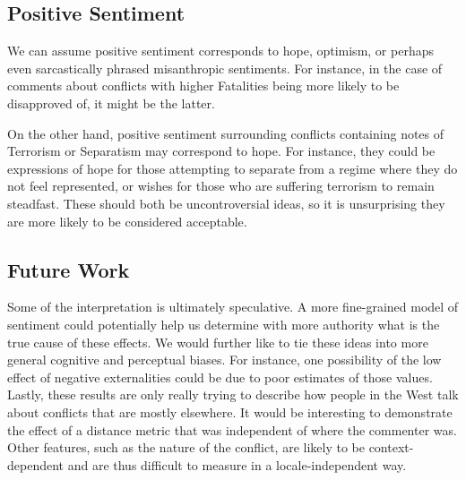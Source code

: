 \subsection{Positive Sentiment}
We can assume positive sentiment corresponds to hope, optimism, or perhaps even sarcastically phrased misanthropic sentiments. For instance, in the case of comments about conflicts with higher Fatalities being more likely to be disapproved of, it might be the latter. 

On the other hand, positive sentiment surrounding conflicts containing notes of Terrorism or Separatism may correspond to hope. For instance, they could be expressions of hope for those attempting to separate from a regime where they do not feel represented, or wishes for those who are suffering terrorism to remain steadfast. These should both be uncontroversial ideas, so it is unsurprising they are more likely to be considered acceptable.

\subsection{Future Work}
Some of the interpretation is ultimately speculative. A more fine-grained model of sentiment could potentially help us determine with more authority what is the true cause of these effects. We would further like to tie these ideas into more general cognitive and perceptual biases. For instance, one possibility of the low effect of negative externalities could be due to poor estimates of those values. Lastly, these results are only really trying to describe how people in the West talk about conflicts that are mostly elsewhere. It would be interesting to demonstrate the effect of a distance metric that was independent of where the commenter was. Other features, such as the nature of the conflict, are likely to be context-dependent and are thus difficult to measure in a locale-independent way.